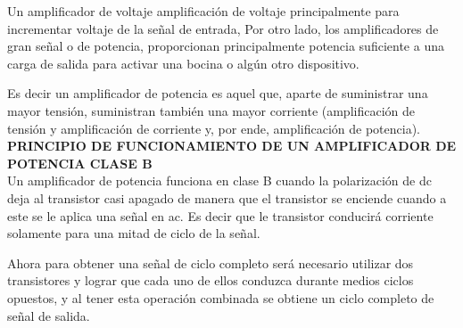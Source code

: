 \documentclass[10pt,a4paper]{article}
\begin{document}
Un amplificador de voltaje amplificación de voltaje principalmente para incrementar voltaje de la señal de entrada, Por otro lado, los amplificadores de gran señal o de potencia, proporcionan principalmente potencia suficiente a una carga de salida para activar una bocina o algún otro dispositivo.

Es decir un amplificador de potencia es aquel que, aparte de suministrar una mayor tensión, suministran también una mayor corriente (amplificación de tensión y amplificación de corriente y, por ende, amplificación de potencia).\\
\textbf{PRINCIPIO DE FUNCIONAMIENTO DE UN AMPLIFICADOR DE POTENCIA CLASE B}\\
Un amplificador de potencia funciona en clase B cuando la polarización de dc deja al transistor casi apagado de manera que el transistor se enciende cuando a este se le aplica una señal en ac. Es decir que le transistor conducirá corriente solamente para una mitad de ciclo de la señal.

Ahora para obtener una señal de ciclo completo será necesario utilizar dos transistores y lograr que cada uno de ellos conduzca durante medios ciclos opuestos, y al tener esta operación combinada se obtiene un ciclo completo de señal de salida.
\end{document}
